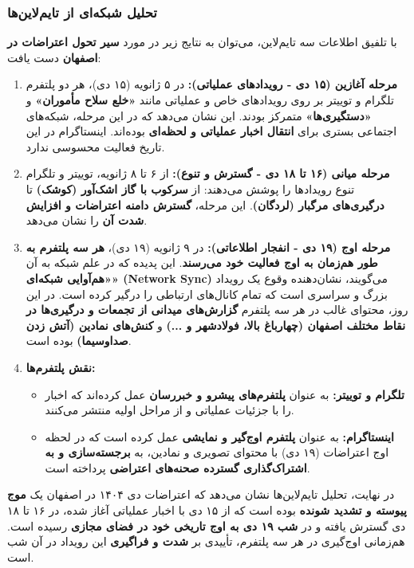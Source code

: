 \documentclass{article}
\begin{document}
\subsubsection{تحلیل شبکه‌ای از تایم‌لاین‌ها}

با تلفیق اطلاعات سه تایم‌لاین، می‌توان به نتایج زیر در مورد \textbf{سیر تحول اعتراضات در اصفهان} دست یافت:

\begin{enumerate}
	\item \textbf{مرحله آغازین (۱۵ دی - رویدادهای عملیاتی):} در ۵ ژانویه (۱۵ دی)، هر دو پلتفرم تلگرام و توییتر بر روی رویدادهای خاص و عملیاتی مانند \textbf{«خلع سلاح مأموران»} و \textbf{«دستگیری‌ها»} متمرکز بودند. این نشان می‌دهد که در این مرحله، شبکه‌های اجتماعی بستری برای \textbf{انتقال اخبار عملیاتی و لحظه‌ای} بوده‌اند. اینستاگرام در این تاریخ فعالیت محسوسی ندارد.
	\item \textbf{مرحله میانی (۱۶ تا ۱۸ دی - گسترش و تنوع):} از ۶ تا ۸ ژانویه، توییتر و تلگرام تنوع رویدادها را پوشش می‌دهند: از \textbf{سرکوب با گاز اشک‌آور (کوشک)} تا \textbf{درگیری‌های مرگبار (لردگان)}. این مرحله، \textbf{گسترش دامنه اعتراضات و افزایش شدت آن} را نشان می‌دهد.
	\item \textbf{مرحله اوج (۱۹ دی - انفجار اطلاعاتی):} در ۹ ژانویه (۱۹ دی)، \textbf{هر سه پلتفرم به طور هم‌زمان به اوج فعالیت خود می‌رسند}. این پدیده که در علم شبکه به آن \textbf{«هم‌آوایی شبکه‌ای» (Network Sync)} می‌گویند، نشان‌دهنده وقوع یک رویداد بزرگ و سراسری است که تمام کانال‌های ارتباطی را درگیر کرده است. در این روز، محتوای غالب در هر سه پلتفرم \textbf{گزارش‌های میدانی از تجمعات و درگیری‌ها در نقاط مختلف اصفهان (چهارباغ بالا، فولادشهر و ...)} و \textbf{کنش‌های نمادین (آتش زدن صداوسیما)} بوده است.
	\item \textbf{نقش پلتفرم‌ها:}
	\begin{itemize}
		\item \textbf{تلگرام و توییتر:} به عنوان \textbf{پلتفرم‌های پیشرو و خبررسان} عمل کرده‌اند که اخبار را با جزئیات عملیاتی و از مراحل اولیه منتشر می‌کنند.
		\item \textbf{اینستاگرام:} به عنوان \textbf{پلتفرم اوج‌گیر و نمایشی} عمل کرده است که در لحظه اوج اعتراضات (۱۹ دی) با محتوای تصویری و نمادین، به \textbf{برجسته‌سازی و به اشتراک‌گذاری گسترده صحنه‌های اعتراضی} پرداخته است.
	\end{itemize}
\end{enumerate}

در نهایت، تحلیل تایم‌لاین‌ها نشان می‌دهد که اعتراضات دی ۱۴۰۴ در اصفهان یک \textbf{موج پیوسته و تشدید شونده} بوده است که از ۱۵ دی با اخبار عملیاتی آغاز شده، در ۱۶ تا ۱۸ دی گسترش یافته و در \textbf{شب ۱۹ دی به اوج تاریخی خود در فضای مجازی} رسیده است. هم‌زمانی اوج‌گیری در هر سه پلتفرم، تأییدی بر \textbf{شدت و فراگیری} این رویداد در آن شب است.
\end{document}
